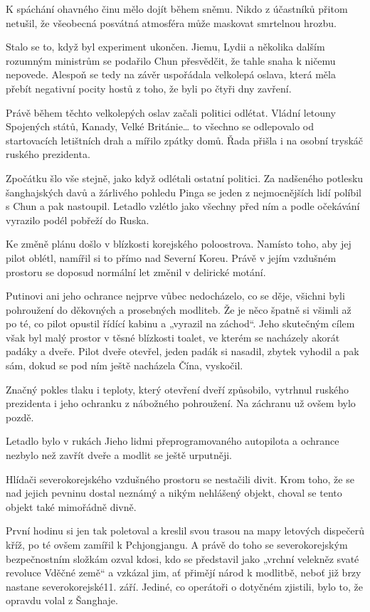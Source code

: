 K spáchání ohavného činu mělo dojít během sněmu. Nikdo z účastníků přitom netušil, že všeobecná posvátná atmosféra může maskovat smrtelnou hrozbu. 

Stalo se to, když byl experiment ukončen. Jiemu, Lydii a několika dalším rozumným ministrům se podařilo Chun přesvědčit, že tahle snaha k ničemu nepovede. Alespoň se tedy na závěr uspořádala velkolepá oslava, která měla přebít negativní pocity hostů z toho, že byli po čtyři dny zavření.

Právě během těchto velkolepých oslav začali politici odlétat. Vládní letouny Spojených států, Kanady, Velké Británie… to všechno se odlepovalo od startovacích letištních drah a mířilo zpátky domů. Řada přišla i na osobní tryskáč ruského prezidenta.

Zpočátku šlo vše stejně, jako když odlétali ostatní politici. Za nadšeného potlesku šanghajských davů a žárlivého pohledu Pinga se jeden z nejmocnějších lidí políbil s Chun a pak nastoupil. Letadlo vzlétlo jako všechny před ním a podle očekávání vyrazilo podél pobřeží do Ruska.

Ke změně plánu došlo v blízkosti korejského poloostrova. Namísto toho, aby jej pilot oblétl, namířil si to přímo nad Severní Koreu. Právě v jejím vzdušném prostoru se doposud normální let změnil v delirické motání.

Putinovi ani jeho ochrance nejprve vůbec nedocházelo, co se děje, všichni byli pohroužení do děkovných a prosebných modliteb. Že je něco špatně si všimli až po té, co pilot opustil řídící kabinu a „vyrazil na záchod“. Jeho skutečným cílem však byl malý prostor v těsné blízkosti toalet, ve kterém se nacházely akorát padáky a dveře. Pilot dveře otevřel, jeden padák si nasadil, zbytek vyhodil a pak sám, dokud se pod ním ještě nacházela Čína, vyskočil.

Značný pokles tlaku i teploty, který otevření dveří způsobilo, vytrhnul ruského prezidenta i jeho ochranku z nábožného pohroužení. Na záchranu už ovšem bylo pozdě. 

Letadlo bylo v rukách Jieho lidmi přeprogramovaného autopilota a ochrance nezbylo než zavřít dveře a modlit se ještě urputněji.  

Hlídači severokorejského vzdušného prostoru se nestačili divit. Krom toho, že se nad jejich pevninu dostal neznámý a nikým nehlášený objekt, choval se tento objekt také mimořádně divně.

První hodinu si jen tak poletoval a kreslil svou trasou na mapy letových dispečerů kříž, po té ovšem zamířil k Pchjongjangu. A právě do toho se severokorejským bezpečnostním složkám ozval kdosi, kdo se představil jako „vrchní velekněz svaté revoluce Vděčné země“ a vzkázal jim, ať přimějí národ k modlitbě, neboť již brzy nastane severokorejské11. září. Jediné, co operátoři o dotyčném zjistili, bylo to, že opravdu volal z Šanghaje. 

